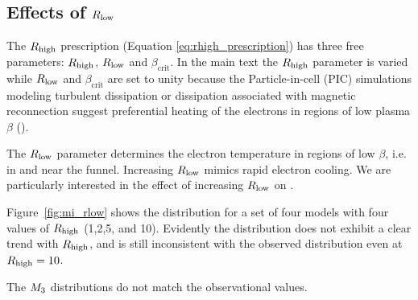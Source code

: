 %
\subsection{Effects of \texorpdfstring{$R_\mathrm{low}$}{Rl} } %

The $R_\mathrm{high}$ prescription (Equation \ref{eq:rhigh_prescription}) has three free parameters: $R_\mathrm{high}$, $R_\mathrm{low}$ and $\beta_\mathrm{crit}$. In the main text the $R_\mathrm{high}$ parameter is varied while $R_\mathrm{low}$ and $\beta_\mathrm{crit}$ are set to unity because the Particle-in-cell (PIC) simulations modeling turbulent dissipation or dissipation associated with magnetic reconnection suggest preferential heating of the electrons in regions of low plasma $\beta$ (\citealt{2010MNRAS.409L.104H, Rowan_2017, 10.1093/mnras/stx2530, Rowan_2019, Kawazura771, PhysRevX.10.041050, kawazura2021energy}).  

The $R_\mathrm{low}$ parameter determines the electron temperature in regions of low $\beta$, i.e. in and near the funnel. Increasing $R_\mathrm{low}$ mimics rapid electron cooling.  We are particularly interested in the effect of increasing $R_\mathrm{low}$ on .  

Figure~\ref{fig:mi_rlow} shows the  distribution for a set of four \kharma models with four values of $R_\mathrm{high}$ (1,2,5, and 10).  Evidently the  distribution does not exhibit a clear trend with $R_\mathrm{high}$, and is still inconsistent with the observed distribution even at $R_\mathrm{high} = 10$.  


The $M_{3}$ distributions do not match the observational values.

